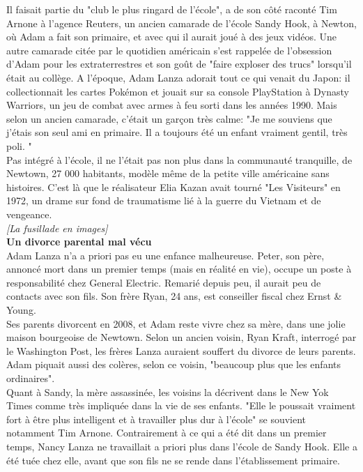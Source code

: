 \documentclass[11pt,twoside,a4paper]{article}
\begin{document}
Il faisait partie du "club le plus ringard de l'{\'e}cole", a de son c{\^o}t{\'e} racont{\'e} Tim Arnone {\`a} l'agence Reuters, un ancien camarade de l'{\'e}cole Sandy Hook, {\`a} Newton, o{\`u} Adam a fait son primaire, et avec qui il aurait jou{\'e} {\`a} des jeux vid{\'e}os. Une autre camarade cit{\'e}e par le quotidien am{\'e}ricain s'est rappel{\'e}e de l'obsession d'Adam pour les extraterrestres et son go{\^u}t de "faire exploser des trucs" lorsqu'il {\'e}tait au coll{\`e}ge. A l'{\'e}poque, Adam Lanza adorait tout ce qui venait du Japon: il collectionnait les cartes Pok{\'e}mon et jouait sur sa console PlayStation {\`a} Dynasty Warriors, un jeu de combat avec armes {\`a} feu sorti dans les ann{\'e}es 1990. Mais selon un ancien camarade, c'{\'e}tait un gar\c{c}on tr{\`e}s calme: "Je me souviens que j'{\'e}tais son seul ami en primaire. Il a toujours {\'e}t{\'e} un enfant vraiment gentil, tr{\`e}s poli. " ~\\ 

Pas int{\'e}gr{\'e} {\`a} l'{\'e}cole, il ne l'{\'e}tait pas non plus dans la communaut{\'e} tranquille, de Newtown, 27 000 habitants, mod{\`e}le m{\^e}me de la petite ville am{\'e}ricaine sans histoires. C'est l{\`a} que le r{\'e}alisateur Elia Kazan avait tourn{\'e} "Les Visiteurs" en 1972, un drame sur fond de traumatisme li{\'e} {\`a} la guerre du Vietnam et de vengeance.  ~\\

\emph{[La fusillade en images]}~\\

\textbf{Un divorce parental mal v{\'e}cu}~\\

Adam Lanza n'a a priori pas eu une enfance malheureuse. Peter, son p{\`e}re, annonc{\'e} mort dans un premier temps (mais en r{\'e}alit{\'e} en vie), occupe un poste {\`a} responsabilit{\'e} chez General Electric. Remari{\'e} depuis peu, il aurait peu de contacts avec son fils. Son fr{\`e}re Ryan, 24 ans, est conseiller fiscal chez Ernst \& Young. ~\\

Ses parents divorcent en 2008, et Adam reste vivre chez sa m{\`e}re, dans une jolie maison bourgeoise de Newtown. Selon un ancien voisin, Ryan Kraft, interrog{\'e} par le Washington Post, les fr{\`e}res Lanza auraient souffert du divorce de leurs parents. Adam piquait aussi des col{\`e}res, selon ce voisin, "beaucoup plus que les enfants ordinaires". ~\\

Quant {\`a} Sandy, la m{\`e}re assassin{\'e}e, les voisins la d{\'e}crivent dans le New Yok Times comme tr{\`e}s impliqu{\'e}e dans la vie de ses enfants. "Elle le poussait vraiment fort {\`a} {\^e}tre plus intelligent et {\`a} travailler plus dur {\`a} l'{\'e}cole" se souvient notamment Tim Arnone. Contrairement {\`a} ce qui a {\'e}t{\'e} dit dans un premier temps, Nancy Lanza ne travaillait a priori plus dans l'{\'e}cole de Sandy Hook. Elle a {\'e}t{\'e} tu{\'e}e chez elle, avant que son fils ne se rende dans l'{\'e}tablissement primaire. ~\\
\end{document}
